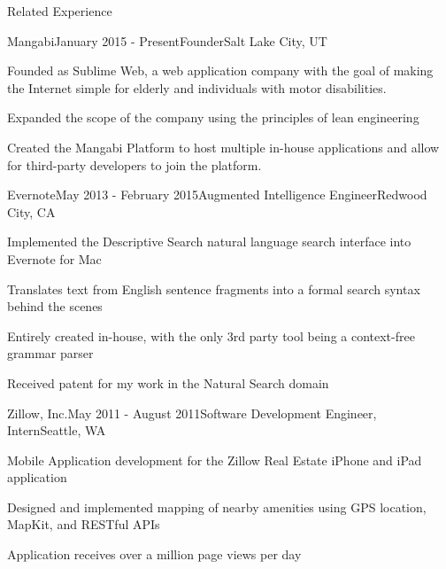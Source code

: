 \documentclass{resume}
\begin{document}
\begin{relatedExperience}
\begin{rSection}{Related Experience}

\begin{experienceMangabi}
\begin{rSubsection}{Mangabi}{January 2015 - Present}{Founder}{Salt Lake City, UT}
\item Founded as Sublime Web, a web application company with the goal of making the Internet simple for elderly and individuals with motor disabilities.
\item Expanded the scope of the company using the principles of lean engineering
\item Created the Mangabi Platform to host multiple in-house applications and allow for third-party developers to join the platform.
\end{rSubsection}
\end{experienceMangabi}


\begin{experienceEvernote}
\begin{rSubsection}{Evernote}{May 2013 - February 2015}{Augmented Intelligence Engineer}{Redwood City, CA}
\item Implemented the Descriptive Search natural language search interface into Evernote for Mac
\item Translates text from English sentence fragments into a formal search syntax behind the scenes
\item Entirely created in-house, with the only 3rd party tool being a context-free grammar parser
\item Received patent for my work in the Natural Search domain
\end{rSubsection}
\end{experienceEvernote}


\begin{experienceZillow}
\begin{rSubsection}{Zillow, Inc.}{May 2011 - August 2011}{Software Development Engineer, Intern}{Seattle, WA}
\item Mobile Application development for the Zillow Real Estate iPhone and iPad application
\item Designed and implemented mapping of nearby amenities using GPS location, MapKit, and RESTful APIs
\item Application receives over a million page views per day
\end{rSubsection}
\end{experienceZillow}


\end{rSection}
\end{relatedExperience}
\end{document}
